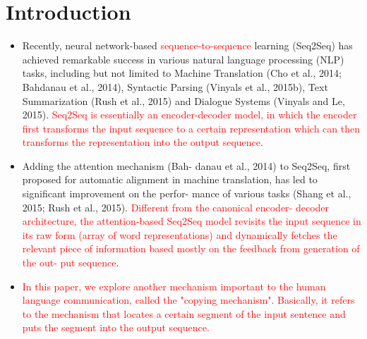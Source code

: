 \documentclass[UTF8]{ctexart}
\begin{document}
    \section{Introduction}
    \begin{itemize}
    \item Recently, neural network-based \textcolor{red}{sequence-to-sequence} learning (Seq2Seq) has achieved remarkable success in various natural language processing (NLP) tasks, including but not limited to Machine Translation (Cho et al., 2014; Bahdanau
    et al., 2014), Syntactic Parsing (Vinyals et al.,
    2015b), Text Summarization (Rush et al., 2015)
    and Dialogue Systems (Vinyals and Le, 2015). \textcolor{red}{Seq2Seq is essentially an encoder-decoder model,
    in which the encoder first transforms the input sequence to a certain representation which can then
    transforms the representation into the output sequence}.
    \item Adding the attention mechanism (Bah-
    danau et al., 2014) to Seq2Seq, first proposed
    for automatic alignment in machine translation,
    has led to significant improvement on the perfor-
    mance of various tasks (Shang et al., 2015; Rush et
    al., 2015). \textcolor{red}{ Different from the canonical encoder-
    decoder architecture, the attention-based Seq2Seq
    model revisits the input sequence in its raw form
    (array of word representations) and dynamically
    fetches the relevant piece of information based
    mostly on the feedback from generation of the out-
    put sequence}.
    \item \textcolor{red}{In this paper, we explore another mechanism
    important to the human language communication,
    called the "copying mechanism". Basically, it
    refers to the mechanism that locates a certain segment of the input sentence and puts the segment
    into the output sequence. }


\end{itemize}
\end{document}

